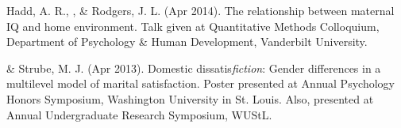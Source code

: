 \item Hadd, A. R., \meb, \& Rodgers, J. L. (Apr 2014). The relationship between maternal IQ and home environment. Talk given at Quantitative Methods Colloquium, Department of Psychology \& Human Development, Vanderbilt University.
\item\meb \& Strube, M. J. (Apr 2013). Domestic dissatis{\em fiction}: Gender differences in a multilevel model of marital satisfaction. Poster presented at Annual Psychology Honors Symposium, Washington University in St. Louis. Also, presented at Annual Undergraduate Research Symposium, WUStL.
\smallskip\\

